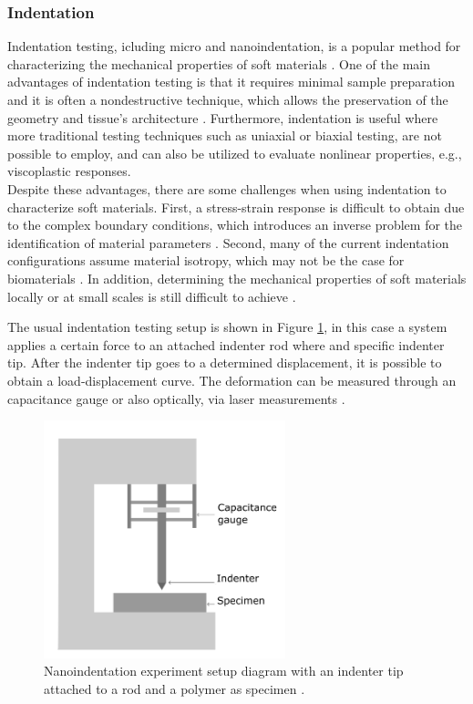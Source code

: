 \subsubsection*{Indentation}
Indentation testing, icluding micro and nanoindentation, is a popular method for characterizing 
the mechanical properties of soft materials \cite{Wu2016}. One of the main advantages of 
indentation testing is that it requires minimal sample preparation and it is often a 
nondestructive technique, which allows the preservation of the geometry and tissue's architecture \cite{Shi2019}.
Furthermore, indentation is useful where more traditional testing techniques such as 
uniaxial or biaxial testing, are not possible to employ, 
and can also be utilized to evaluate nonlinear properties, e.g., viscoplastic responses\cite{Bergström2015}.\\

Despite these advantages, there are some challenges when using indentation to 
characterize soft materials. First, a stress-strain response is difficult to
obtain due to the complex boundary conditions, which introduces an inverse problem 
for the identification of material parameters \cite{Shi2019}. Second, many of the current 
indentation configurations assume material isotropy, which may not be the case for biomaterials \cite{Feng2017}.
In addition, determining the mechanical properties of soft materials locally or at small scales is still difficult to achieve \cite{Zhang2014}.


The usual indentation testing setup is shown in Figure \ref{fig:Nanoindentation}, in this case a 
system applies a certain force to an attached indenter rod where and specific 
indenter tip. After the indenter tip goes to a determined displacement, 
it is possible to obtain a load-displacement curve.
The deformation can be measured through an capacitance gauge or also optically, via laser measurements \cite{Bergström2015}.

\begin{figure}[th]
        \centering
        \includegraphics[width=7cm]{Images/nanoindentationbigletter}
        \caption[Nanoindentation]{Nanoindentation experiment setup diagram with an indenter tip attached to a rod and a polymer as specimen \cite{Bergström2015}.}
        \label{fig:Nanoindentation}
\end{figure}

